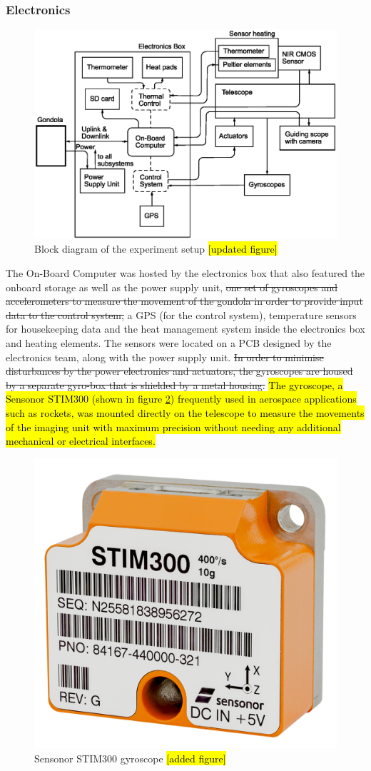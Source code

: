 \subsubsection{Electronics}

\begin{figure}[htb]
	\centering
	\includegraphics[width = \linewidth]{4-experiment-design/img/setup/Block_diagram_4-1}
	\caption{Block diagram of the experiment setup \hl{[updated figure]}}
	\label{fig::4-1_block_diagram}
\end{figure}

The On-Board Computer was hosted by the electronics box that also featured the onboard storage as well as the power supply unit, \st{one set of gyroscopes and accelerometers to measure the movement of the gondola in order to provide input data to the control system,} a GPS (for the control system), temperature sensors for housekeeping data and the heat management system inside the electronics box and heating elements. The sensors were located on a PCB designed by the electronics team, along with the power supply unit. \st{In order to minimise disturbances by the power electronics and actuators, the gyroscopes are housed by a separate gyro-box that is shielded by a metal housing.}
\hl{The gyroscope, a Sensonor STIM300 (shown in figure \mbox{\ref{fig::4-1_stim300}}) frequently used in aerospace applications such as rockets, was mounted directly on the telescope to measure the movements of the imaging unit with maximum precision without needing any additional mechanical or electrical interfaces.}
\begin{figure}[htb]
	\centering
	\includegraphics[width = 0.25\linewidth]{4-experiment-design/img/setup/sensonor-stim-300}
	\caption{Sensonor STIM300 gyroscope \hl{[added figure]}}
	\label{fig::4-1_stim300}
\end{figure}


